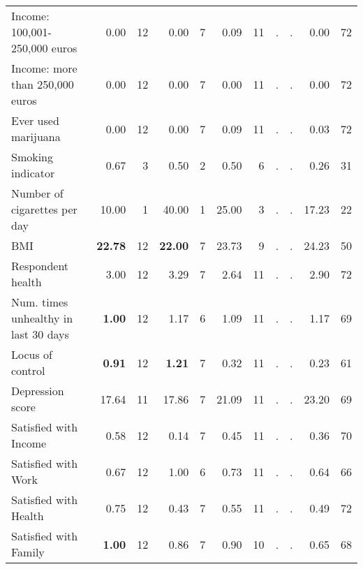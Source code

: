 \begin{tabular}{l r r r r r r r r r r}
Income: 100,001-250,000 euros &      0.00 &        12 &      0.00 &         7 &      0.09 &        11 &         . & . &      0.00 &        72 \\
Income: more than 250,000 euros &      0.00 &        12 &      0.00 &         7 &      0.00 &        11 &         . & . &      0.00 &        72 \\
Ever used marijuana &      0.00 &        12 &      0.00 &         7 &      0.09 &        11 &         . & . &      0.03 &        72 \\
Smoking indicator &      0.67 &         3 &      0.50 &         2 &      0.50 &         6 &         . & . &      0.26 &        31 \\
Number of cigarettes per day &     10.00 &         1 &     40.00 &         1 &     25.00 &         3 &         . & . &     17.23 &        22 \\
BMI & \textbf{    22.78} &        12 & \textbf{    22.00} &         7 &     23.73 &         9 &         . & . &     24.23 &        50 \\
Respondent health &      3.00 &        12 &      3.29 &         7 &      2.64 &        11 &         . & . &      2.90 &        72 \\
Num. times unhealthy in last 30 days & \textbf{     1.00} &        12 &      1.17 &         6 &      1.09 &        11 &         . & . &      1.17 &        69 \\
Locus of control & \textbf{     0.91} &        12 & \textbf{     1.21} &         7 &      0.32 &        11 &         . & . &      0.23 &        61 \\
Depression score &     17.64 &        11 &     17.86 &         7 &     21.09 &        11 &         . & . &     23.20 &        69 \\
Satisfied with Income &      0.58 &        12 &      0.14 &         7 &      0.45 &        11 &         . & . &      0.36 &        70 \\
Satisfied with Work &      0.67 &        12 &      1.00 &         6 &      0.73 &        11 &         . & . &      0.64 &        66 \\
Satisfied with Health &      0.75 &        12 &      0.43 &         7 &      0.55 &        11 &         . & . &      0.49 &        72 \\
Satisfied with Family & \textbf{     1.00} &        12 &      0.86 &         7 &      0.90 &        10 &         . & . &      0.65 &        68 \\
\bottomrule
\end{tabular}

